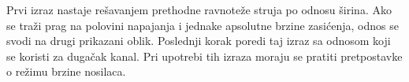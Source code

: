 Prvi izraz nastaje rešavanjem prethodne ravnoteže struja po odnosu širina. Ako se traži prag na polovini napajanja i jednake apsolutne brzine zasićenja, odnos se svodi na drugi prikazani oblik. Poslednji korak poredi taj izraz sa odnosom koji se koristi za dugačak kanal. Pri upotrebi tih izraza moraju se pratiti pretpostavke o režimu brzine nosilaca.
